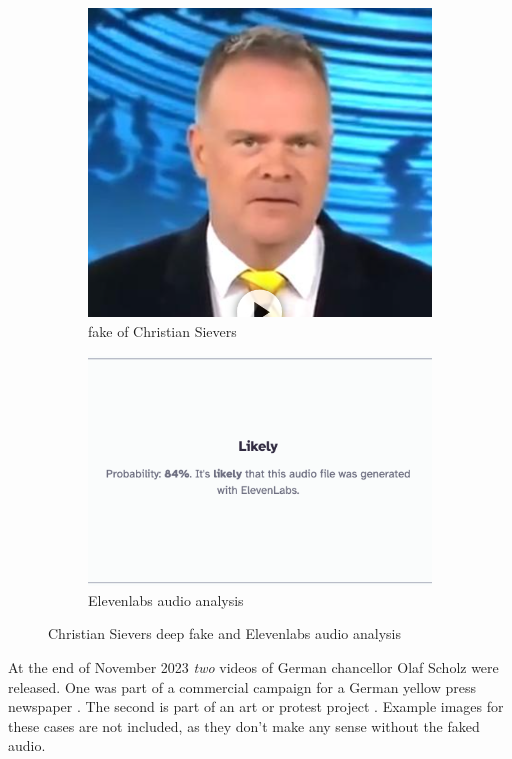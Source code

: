 \documentclass[
  a4paper,  %
  twoside,  %
  bibliography=totoc,
  headsepline,
  cleardoublepage=empty,
  parskip=half,
  draft=false
]{scrbook}
\begin{document}
\begin{figure}[h]
  \centering
  \begin{subfigure}[b]{0.45\textwidth}
    \includegraphics[width=\textwidth]{./graphics/images/sievers.png}
    \caption{fake of Christian Sievers \cite{zdfDeepfakeMitZDFModerator}}
    \label{fig:sievers-fake}
  \end{subfigure}
  \hfill
  \begin{subfigure}[b]{0.5\textwidth}
    \includegraphics[width=\textwidth]{./graphics/images/sievers-11labs.png}
    \caption{Elevenlabs audio analysis \cite{elevenlabsAISpeechClassifier}}
    \label{fig:sievers-11labs}
  \end{subfigure}
  \caption{Christian Sievers deep fake and Elevenlabs audio analysis}
\end{figure}
At the end of November 2023 \textit{two} videos of German chancellor Olaf Scholz were released. One was part of a commercial campaign for a German yellow press newspaper \cite{dwdl.deSpringerTrommeltMit}. The second is part of an art or protest project \cite{zdfKunstinstallationDeepfakeScholzVerkuendet}. Example images for these cases are not included, as they don't make any sense without the faked audio. 
\end{document}
